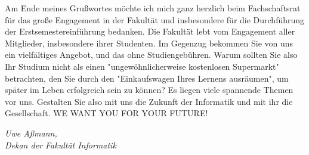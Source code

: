 {Am Ende meines Grußwortes möchte ich mich ganz herzlich beim Fachschaftsrat für das große Engagement in der Fakultät und insbesondere für die Durchführung der Erstsemestereinführung bedanken. Die Fakultät lebt vom Engagement aller Mitglieder, insbesondere ihrer Studenten. Im Gegenzug bekommen Sie von uns ein vielfältiges Angebot, und das ohne Studiengebühren. Warum sollten Sie also Ihr Studium nicht als einen "ungewöhnlicherweise kostenlosen Supermarkt" betrachten, den Sie durch den "Einkaufswagen Ihres Lernens ausräumen", um später im Leben erfolgreich sein zu können? Es liegen viele spannende Themen vor uns. Gestalten Sie also mit uns die Zukunft der Informatik und mit ihr die Gesellschaft. WE WANT YOU FOR YOUR FUTURE!


\textit{Uwe Aßmann,\\
Dekan der Fakultät Informatik}

}

